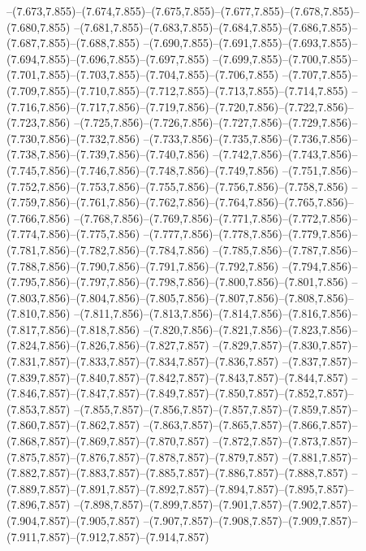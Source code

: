   --(7.673,7.855)--(7.674,7.855)--(7.675,7.855)--(7.677,7.855)--(7.678,7.855)--(7.680,7.855)%
  --(7.681,7.855)--(7.683,7.855)--(7.684,7.855)--(7.686,7.855)--(7.687,7.855)--(7.688,7.855)%
  --(7.690,7.855)--(7.691,7.855)--(7.693,7.855)--(7.694,7.855)--(7.696,7.855)--(7.697,7.855)%
  --(7.699,7.855)--(7.700,7.855)--(7.701,7.855)--(7.703,7.855)--(7.704,7.855)--(7.706,7.855)%
  --(7.707,7.855)--(7.709,7.855)--(7.710,7.855)--(7.712,7.855)--(7.713,7.855)--(7.714,7.855)%
  --(7.716,7.856)--(7.717,7.856)--(7.719,7.856)--(7.720,7.856)--(7.722,7.856)--(7.723,7.856)%
  --(7.725,7.856)--(7.726,7.856)--(7.727,7.856)--(7.729,7.856)--(7.730,7.856)--(7.732,7.856)%
  --(7.733,7.856)--(7.735,7.856)--(7.736,7.856)--(7.738,7.856)--(7.739,7.856)--(7.740,7.856)%
  --(7.742,7.856)--(7.743,7.856)--(7.745,7.856)--(7.746,7.856)--(7.748,7.856)--(7.749,7.856)%
  --(7.751,7.856)--(7.752,7.856)--(7.753,7.856)--(7.755,7.856)--(7.756,7.856)--(7.758,7.856)%
  --(7.759,7.856)--(7.761,7.856)--(7.762,7.856)--(7.764,7.856)--(7.765,7.856)--(7.766,7.856)%
  --(7.768,7.856)--(7.769,7.856)--(7.771,7.856)--(7.772,7.856)--(7.774,7.856)--(7.775,7.856)%
  --(7.777,7.856)--(7.778,7.856)--(7.779,7.856)--(7.781,7.856)--(7.782,7.856)--(7.784,7.856)%
  --(7.785,7.856)--(7.787,7.856)--(7.788,7.856)--(7.790,7.856)--(7.791,7.856)--(7.792,7.856)%
  --(7.794,7.856)--(7.795,7.856)--(7.797,7.856)--(7.798,7.856)--(7.800,7.856)--(7.801,7.856)%
  --(7.803,7.856)--(7.804,7.856)--(7.805,7.856)--(7.807,7.856)--(7.808,7.856)--(7.810,7.856)%
  --(7.811,7.856)--(7.813,7.856)--(7.814,7.856)--(7.816,7.856)--(7.817,7.856)--(7.818,7.856)%
  --(7.820,7.856)--(7.821,7.856)--(7.823,7.856)--(7.824,7.856)--(7.826,7.856)--(7.827,7.857)%
  --(7.829,7.857)--(7.830,7.857)--(7.831,7.857)--(7.833,7.857)--(7.834,7.857)--(7.836,7.857)%
  --(7.837,7.857)--(7.839,7.857)--(7.840,7.857)--(7.842,7.857)--(7.843,7.857)--(7.844,7.857)%
  --(7.846,7.857)--(7.847,7.857)--(7.849,7.857)--(7.850,7.857)--(7.852,7.857)--(7.853,7.857)%
  --(7.855,7.857)--(7.856,7.857)--(7.857,7.857)--(7.859,7.857)--(7.860,7.857)--(7.862,7.857)%
  --(7.863,7.857)--(7.865,7.857)--(7.866,7.857)--(7.868,7.857)--(7.869,7.857)--(7.870,7.857)%
  --(7.872,7.857)--(7.873,7.857)--(7.875,7.857)--(7.876,7.857)--(7.878,7.857)--(7.879,7.857)%
  --(7.881,7.857)--(7.882,7.857)--(7.883,7.857)--(7.885,7.857)--(7.886,7.857)--(7.888,7.857)%
  --(7.889,7.857)--(7.891,7.857)--(7.892,7.857)--(7.894,7.857)--(7.895,7.857)--(7.896,7.857)%
  --(7.898,7.857)--(7.899,7.857)--(7.901,7.857)--(7.902,7.857)--(7.904,7.857)--(7.905,7.857)%
  --(7.907,7.857)--(7.908,7.857)--(7.909,7.857)--(7.911,7.857)--(7.912,7.857)--(7.914,7.857)%
